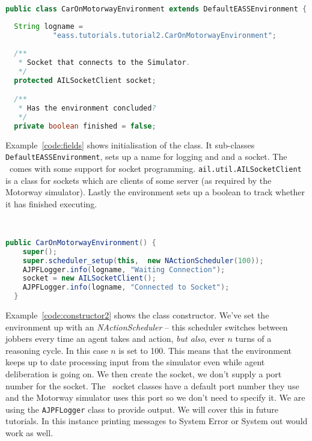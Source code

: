\begin{ourexample}
\label{code:fields} \quad \\
\begin{lstlisting}[basicstyle=\sffamily,language=Java,style=easslisting]
public class CarOnMotorwayEnvironment extends DefaultEASSEnvironment {
  
  String logname = 
           "eass.tutorials.tutorial2.CarOnMotorwayEnvironment";
		
  /**
   * Socket that connects to the Simulator.
   */
  protected AILSocketClient socket;

  /**
   * Has the environment concluded?
   */
  private boolean finished = false;
\end{lstlisting}
\end{ourexample}
Example~\ref{code:fields} shows initialisation of the class.  It sub-classes \texttt{DefaultEASSEnvironment}, sets up a name for logging and and a socket.  The \ail\ comes with some support for socket programming.  \texttt{ail.util.AILSocketClient} is a class for sockets which are clients of some server (as required by the Motorway simulator).  Lastly the environment sets up a boolean to track whether it has finished executing.

\begin{ourexample}
\label{code:constructor2} \quad \\
\begin{lstlisting}[basicstyle=\sffamily,language=Java,style=easslisting]
  public CarOnMotorwayEnvironment() {
    super();
    super.scheduler_setup(this,  new NActionScheduler(100));
    AJPFLogger.info(logname, "Waiting Connection");
    socket = new AILSocketClient();
    AJPFLogger.info(logname, "Connected to Socket");
  }
\end{lstlisting}
\end{ourexample}
Example~\ref{code:constructor2} shows the class constructor.  We've set the environment up with an \emph{NActionScheduler} -- this scheduler switches between jobbers every time an agent takes and action, \emph{but also}, ever $n$ turns of a reasoning cycle.  In this case $n$ is set to 100.  This means that the environment keeps up to date processing input from the simulator even while agent deliberation is going on.  We then create the socket, we don't supply a port number for the socket.  The \ail\ socket classes have a default port number they use and the Motorway simulator uses this port so we don't need to specify it.  We are using the \texttt{AJPFLogger} class to provide output.  We will cover this in future tutorials.  In this instance printing messages to System Error or System out would work as well.

